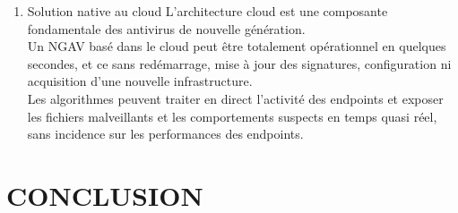 \begin{enumerate}
 \item Solution native au cloud
 L’architecture cloud est une composante fondamentale des antivirus de nouvelle génération.\\
  Un NGAV basé dans le cloud peut être totalement opérationnel en quelques secondes, et ce sans redémarrage, mise à jour des signatures, configuration ni acquisition d’une nouvelle infrastructure.\\
   Les algorithmes peuvent traiter en direct l’activité des endpoints et exposer les fichiers malveillants et les comportements suspects en temps quasi réel, sans incidence sur les performances des endpoints.\\
\end{enumerate}

\chapter*{CONCLUSION}


